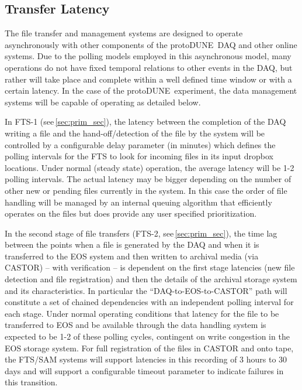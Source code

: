 \documentclass[pdftex,12pt,letter]{article}
\newcommand{\pd}{protoDUNE\ }
\begin{document}
\subsection{Transfer Latency}
The file transfer and management systems are designed to operate asynchronously with other components of the \pd DAQ
and other online systems.
Due to the polling models employed in this asynchronous model, many operations do not have fixed temporal relations to other events in the DAQ,
but rather will take place and complete within a well defined time window or with a certain latency.  In the case of the \pd experiment,
the data management systems will be capable of operating as detailed below.

In FTS-1 (see\,\ref{sec:prim_sec}), the latency between the completion of the DAQ writing a file and the hand-off/detection of the file by the
system will be controlled by a configurable delay parameter (in minutes) which defines the polling intervals for the FTS
to look for  incoming files in its input dropbox locations.  Under normal (steady state) operation, the average latency will be 1-2 polling intervals.
The actual latency may be bigger depending on the number of other new or pending files currently in the system.
In this case the order of file handling will be managed by an internal queuing algorithm that efficiently operates on the files but
does provide any user specified prioritization.

In the second stage of file transfers (FTS-2, see\,\ref{sec:prim_sec}), the time lag between the points when a file is generated by the DAQ
and when it is transferred to the EOS
system and then written to archival media (via CASTOR) -- with verification --  is dependent on the first stage latencies (new file detection and file registration)
and then the details of the archival storage system and its characteristics.  In particular the ``DAQ-to-EOS-to-CASTOR'' path will constitute a set
of chained dependencies with an independent polling interval for each stage.  Under normal operating conditions that latency for the file to
be transferred to EOS and be available through the data handling system is expected to be 1-2 of these polling cycles, contingent on write
congestion in the EOS storage system.   For full registration of the files in CASTOR and onto tape, the FTS/SAM systems will support latencies
in this recording of 3 hours to 30 days and will support a configurable timeout parameter to indicate failures in this transition.
\end{document}

